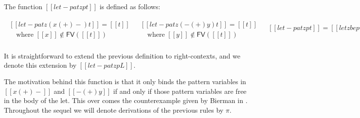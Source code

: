 \begin{definition}
  \label{def:let-pat-term}
  The function $[[let-pat z p t]]$ is defined as follows:
  \vspace{-15px}
  \begin{center}
    \begin{math}
      \begin{array}{lll}      
        \begin{array}{lll}
          [[let-pat z (x (+) -) t]] = [[t]]\\
          \,\,\,\,\,\,\text{where } [[x]] \not\in \mathsf{FV}([[t]])\\
        \end{array}
        & 
          \begin{array}{lll}
            [[let-pat z (- (+) y) t]] = [[t]]\\
        \,\,\,\,\,\,\text{where } [[y]] \not\in \mathsf{FV}([[t]])\\
          \end{array}
        & 
          \begin{array}{lll}
            [[let-pat z p t]] = [[let z be p in t]]\\
            & \\
          \end{array}
      \end{array}
    \end{math}
  \end{center}
  It is straightforward to extend the previous definition to
  right-contexts, and we denote this extension by $[[let-pat z p L]]$.
\end{definition}
The motivation behind this function is that it only binds the pattern
variables in $[[x (+) -]]$ and $[[- (+) y]]$ if and only if those
pattern variables are free in the body of the let.  This over comes the
counterexample given by Bierman in \cite{Bierman:1996}.  Throughout
the sequel we will denote derivations of the previous rules by $\pi$.

